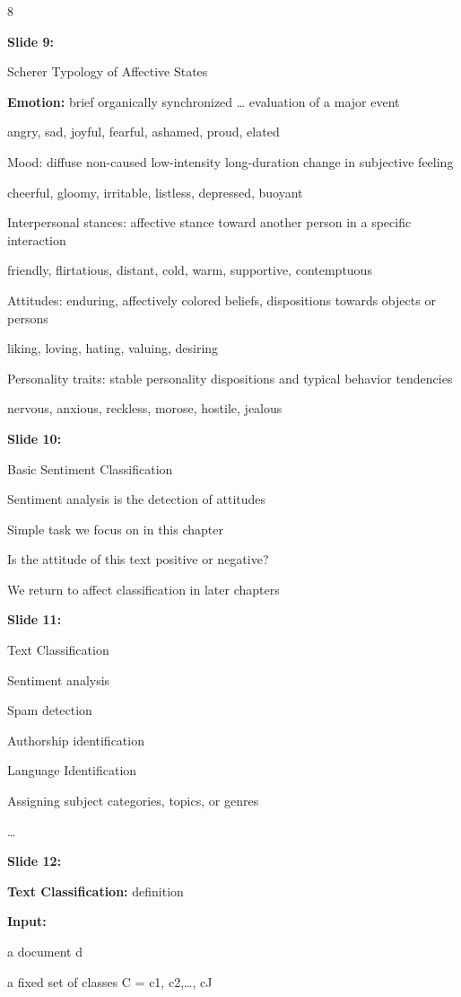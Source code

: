 \documentclass[11pt,a4paper]{article}
\begin{document}
8

\textbf{Slide 9:}

Scherer Typology of Affective States

\textbf{Emotion:}  brief organically synchronized … evaluation of a major event

angry, sad, joyful, fearful, ashamed, proud, elated

Mood: diffuse non-caused low-intensity long-duration change in subjective feeling

cheerful, gloomy, irritable, listless, depressed, buoyant

Interpersonal stances: affective stance toward another person in a specific interaction

friendly, flirtatious, distant, cold, warm, supportive, contemptuous

Attitudes: enduring, affectively colored beliefs, dispositions towards objects or persons

liking, loving, hating, valuing, desiring

Personality traits: stable personality dispositions and typical behavior tendencies

nervous, anxious, reckless, morose, hostile, jealous

\textbf{Slide 10:}

Basic Sentiment Classification

Sentiment analysis is the detection of attitudes

Simple task we focus on in this chapter

Is the attitude of this text positive or negative?

We return to affect classification in later chapters

\textbf{Slide 11:}

Text Classification

Sentiment analysis

Spam detection

Authorship identification

Language Identification

Assigning subject categories, topics, or genres

…

\textbf{Slide 12:}

\textbf{Text Classification:}  definition

\textbf{Input:} 

a document d

a fixed set of classes  C = {c1, c2,…, cJ}
\end{document}
